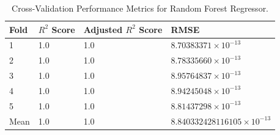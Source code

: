 \documentclass[sn-mathphys]{sn-jnl}%
\theoremstyle{thmstyleone}%
\theoremstyle{thmstyletwo}%
\theoremstyle{thmstylethree}%
\begin{document}
\begin{table}[!htbp]
\caption{Cross-Validation Performance Metrics for Random Forest Regressor.} 
\label{tab:Validate}
\centering 

\begin{tabular}{|l|l|l|l|}  %
\hline 
Fold & $R^2$ Score & Adjusted $R^2$ Score & RMSE \\
\hline 
1 & 1.0 & 1.0 & $8.70383371 \times 10^{-13}$ \\
\hline 
2 & 1.0 & 1.0 & $8.78335660 \times 10^{-13}$ \\
\hline 
3 & 1.0 & 1.0 & $8.95764837 \times 10^{-13}$ \\
\hline 
4 & 1.0 & 1.0 & $8.94245048 \times 10^{-13}$ \\
\hline 
5 & 1.0 & 1.0 & $8.81437298 \times 10^{-13}$ \\
\hline 
Mean & 1.0 & 1.0 & $8.840332428116105 \times 10^{-13}$ \\
\hline

\end{tabular}
\end{table}
\end{document}
